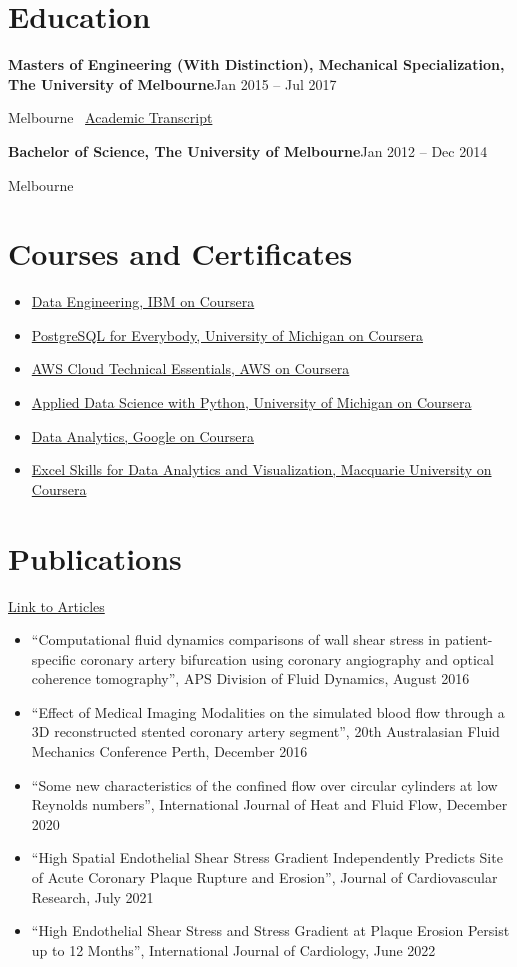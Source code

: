 \documentclass[10pt,a4paper]{article}
\newcommand{\resumesection}[1]{\section*{#1}}
\begin{document}
\resumesection{Education}
\textbf{Masters of Engineering (With Distinction), Mechanical Specialization, The University of Melbourne}\hfill Jan 2015 -- Jul 2017\par
Melbourne \textbar\ \href{https://www.myequals.net/r/sharelink/39bf60f2-2f95-49f6-9c2f-03867a939c90/4a5a7492-b23c-4e9e-87b3-d58a3a20dd87}{Academic Transcript}\par
\vspace{0.3em}
\textbf{Bachelor of Science, The University of Melbourne}\hfill Jan 2012 -- Dec 2014\par
Melbourne

\resumesection{Courses and Certificates}
\begin{itemize}
  \item \href{https://coursera.org/share/e7c8acd9ef97ec13153d23b97eb3ae3d}{Data Engineering, IBM on Coursera}
  \item \href{https://coursera.org/share/a9b1cae25a73e890d4bf699594b8171b}{PostgreSQL for Everybody, University of Michigan on Coursera}
  \item \href{https://coursera.org/share/5eeef59e6fec2ea34ab6729866b8c30a}{AWS Cloud Technical Essentials, AWS on Coursera}
  \item \href{https://www.coursera.org/account/accomplishments/specialization/certificate/XCXYLXJZ4CHS}{Applied Data Science with Python, University of Michigan on Coursera}
  \item \href{https://www.coursera.org/account/accomplishments/specialization/certificate/BK4XG9PK8ESF}{Data Analytics, Google on Coursera}
  \item \href{https://www.coursera.org/account/accomplishments/specialization/certificate/ZDETFK6UQFGF}{Excel Skills for Data Analytics and Visualization, Macquarie University on Coursera}
\end{itemize}

\resumesection{Publications}
\href{https://1drv.ms/u/s!AqKmu53lUHwmiphhitj54APJmTTs7A?e=oJdxgG}{Link to Articles}
\begin{itemize}
  \item ``Computational fluid dynamics comparisons of wall shear stress in patient-specific coronary artery bifurcation using coronary angiography and optical coherence tomography'', APS Division of Fluid Dynamics, August 2016
  \item ``Effect of Medical Imaging Modalities on the simulated blood flow through a 3D reconstructed stented coronary artery segment'', 20th Australasian Fluid Mechanics Conference Perth, December 2016
  \item ``Some new characteristics of the confined flow over circular cylinders at low Reynolds numbers'', International Journal of Heat and Fluid Flow, December 2020
  \item ``High Spatial Endothelial Shear Stress Gradient Independently Predicts Site of Acute Coronary Plaque Rupture and Erosion'', Journal of Cardiovascular Research, July 2021
  \item ``High Endothelial Shear Stress and Stress Gradient at Plaque Erosion Persist up to 12 Months'', International Journal of Cardiology, June 2022
\end{itemize}
\end{document}
